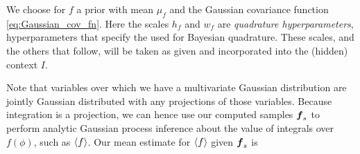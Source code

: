 \documentclass{article}
\begin{document}
% 
% 
% 
% 
% 
% 
% 
% 
% 
% 

We choose for $f$ a 
\gpb prior with mean $\mu_f$ and the Gaussian covariance function \eqref{eq:Gaussian_cov_fn}.
Here the scales $h_f$ and $w_f$ are \emph{quadrature hyperparameters}, hyperparameters that specify the
 \gpb used for Bayesian quadrature. These scales, and the others that follow, will be taken as given and incorporated into the (hidden) context $I$.


Note that variables over which we have a multivariate Gaussian distribution are jointly Gaussian distributed with any projections of those variables. Because integration is a projection, we can hence use our computed samples $\vf_s$ to perform analytic Gaussian process inference about the value of integrals over $f(\phi)$, such as $\inty{f}$. Our mean estimate for $\inty{f}$ given $\vf_s$ is
\end{document}
